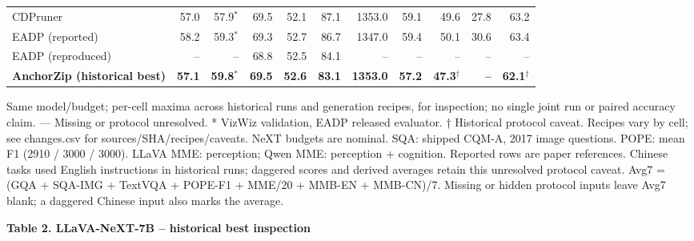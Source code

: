\documentclass[10pt,a4paper]{article}
\begin{document}
{\begin{tabular}{lrrrrrrrrrr}
CDPruner & 57.0 & 57.9$^{*}$ & 69.5 & 52.1 & 87.1 & 1353.0 & 59.1 & 49.6 & 27.8 & 63.2 \\
EADP (reported) & 58.2 & 59.3$^{*}$ & 69.3 & 52.7 & 86.7 & 1347.0 & 59.4 & 50.1 & 30.6 & 63.4 \\
EADP (reproduced) & -- & -- & 68.8 & 52.5 & 84.1 & -- & -- & -- & -- & -- \\
\textbf{AnchorZip (historical best)} & \textbf{57.1} & \textbf{59.8$^{*}$} & \textbf{69.5} & \textbf{52.6} & \textbf{83.1} & \textbf{1353.0} & \textbf{57.2} & \textbf{47.3$^{\dagger}$} & \textbf{--} & \textbf{62.1$^{\dagger}$} \\
\bottomrule\end{tabular}}\endgroup\par\medskip
{\footnotesize Same model/budget; per-cell maxima across historical runs and generation recipes, for inspection; no single joint run or paired accuracy claim. — Missing or protocol unresolved. * VizWiz validation, EADP released evaluator. † Historical protocol caveat. Recipes vary by cell; see changes.csv for sources/SHA/recipes/caveats. NeXT budgets are nominal. SQA: shipped CQM-A, 2017 image questions. POPE: mean F1 (2910 / 3000 / 3000). LLaVA MME: perception; Qwen MME: perception + cognition. Reported rows are paper references. Chinese tasks used English instructions in historical runs; daggered scores and derived averages retain this unresolved protocol caveat. Avg7 = (GQA + SQA-IMG + TextVQA + POPE-F1 + MME/20 + MMB-EN + MMB-CN)/7. Missing or hidden protocol inputs leave Avg7 blank; a daggered Chinese input also marks the average.\par}
\newpage
{\large\textbf{Table 2. LLaVA-NeXT-7B -- historical best inspection}}\par\medskip
\begingroup\setlength{\tabcolsep}{3.2pt}\renewcommand{\arraystretch}{1.03}
\end{document}
